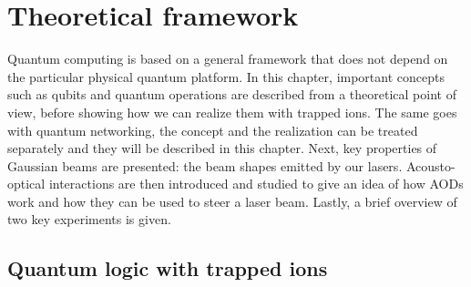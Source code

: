 \setlength{\parskip}{.5mm plus 0mm minus 0mm}
\chapter{Theoretical framework}
Quantum computing is based on a general framework that does not depend on the particular physical quantum platform. In this chapter, important concepts such as qubits and quantum operations are described from a theoretical point of view, before showing how we can realize them with trapped ions. The same goes with quantum networking, the concept and the realization can be treated separately and they will be described in this chapter. Next, key properties of Gaussian beams are presented: the beam shapes emitted by our lasers. Acousto-optical interactions are then introduced and studied to give an idea of how AODs work and how they can be used to steer a laser beam. Lastly, a brief overview of two key experiments is given.

\section{Quantum logic with trapped ions}
